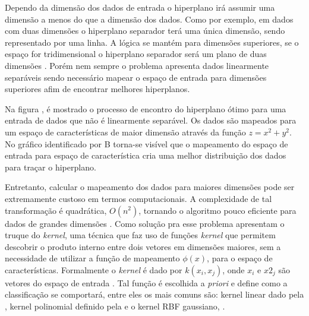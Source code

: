 Dependo da dimensão dos dados de entrada o hiperplano irá assumir uma dimensão a menos do que a dimensão dos dados. Como por exemplo, em dados com duas dimensões o hiperplano separador terá uma única dimensão, sendo representado por uma linha. A lógica se mantém para dimensões superiores, se o espaço for tridimensional o hiperplano separador será um plano de duas dimensões \cite{hamel2011knowledge}. Porém nem sempre o problema apresenta dados linearmente separáveis sendo necessário mapear o espaço de entrada para dimensões superiores afim de encontrar melhores hiperplanos.

Na figura , é mostrado o processo de encontro do hiperplano ótimo para uma entrada de dados que não é linearmente separável. Os dados são mapeados para um espaço de características de maior dimensão através da função $z = x^2 + y^2$. No gráfico identificado por B torna-se visível que o mapeamento do espaço de entrada para espaço de característica cria uma melhor distribuição dos dados para traçar o hiperplano.

%


Entretanto, calcular o mapeamento dos dados para maiores dimensões pode ser extremamente custoso em termos computacionais. A complexidade de tal transformação é quadrática, $O(n^2)$, tornando o algoritmo pouco eficiente para dados de grandes dimensões \cite{hamel2011knowledge}. Como solução pra esse problema \textcite{boser1992training} apresentam o truque do \textit{kernel}, uma técnica que faz uso de funções \textit{kernel} que permitem descobrir o produto interno entre dois vetores em dimensões maiores, sem a necessidade de utilizar a função de mapeamento $\phi(x)$, para o espaço de características. Formalmente o \textit{kernel} é dado por $k(x_i, x_j)$, onde $x_i$ e $x2_j$ são vetores do espaço de entrada \cite{scholkopf2001learning}. Tal função é escolhida a \textit{priori} e define como a classificação se comportará, entre eles os mais comuns são: kernel linear dado pela , kernel polinomial definido pela  e o kernel RBF gaussiano, .



